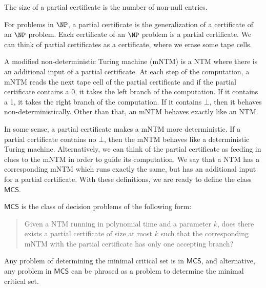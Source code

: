 \documentclass[runningheads,a4paper]{llncs}
\begin{document}
\begin{definition}
\begin{definition}
The size of a partial certificate is the number of non-null entries. 
\end{definition}

For problems in $\NP$, a partial certificate is the generalization of a certificate of an $\NP$ problem. Each certificate of an $\NP$ problem is a partial certificate. We can think of partial certificates as a certificate, where we erase some tape cells.

\begin{definition}
A modified non-deterministic Turing machine (mNTM) is a NTM where there is an additional input of a partial certificate. At each step of the computation, a mNTM reads the next tape cell of the partial certificate and if the partial certificate contains a 0, it takes the left branch of the computation. If it contains a 1, it takes the right branch of the computation. If it contains $\bot$, then it behaves non-deterministically. Other than that, an mNTM behaves exactly like an NTM.
\end{definition}

In some sense, a partial certificate makes a mNTM more deterministic. If a partial certificate contains no $\bot$, then the mNTM behaves like a deterministic Turing machine. Alternatively, we can think of the partial certificate as feeding in clues to the mNTM in order to guide its computation. We say that a NTM has a corresponding mNTM which runs exactly the same, but has an additional input for a partial certificate. With these definitions, we are ready to define the class $\mathsf{MCS}$.

\begin{definition}
$\mathsf{MCS}$ is the class of decision problems of the following form:\\
\begin{quote}
Given a NTM running in polynomial time and a parameter $k$, does there exists a partial certificate of size at most $k$ such that the corresponding mNTM with the partial certificate has only one accepting branch?
\end{quote}
\end{definition}

\begin{proposition}
Any problem of determining the minimal critical set is in $\mathsf{MCS}$, and alternative, any problem in $\mathsf{MCS}$ can be phrased as a problem to determine the minimal critical set.
\end{proposition}


\end{definition}
\end{document}
